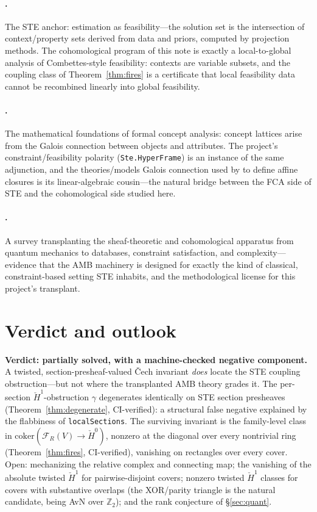 \documentclass[11pt]{article}
\newcommand{\lean}[1]{\texttt{#1}}
\newcommand{\cech}{\v{C}ech}
\newcommand{\Hc}[1]{\check{H}^{#1}}
\newcommand{\FR}{\mathcal{F}_R}
\newcommand{\coker}{\mathrm{coker}}
\newcommand{\Z}{\mathbb{Z}}
\begin{document}
\paragraph{\citet{combettes1993}.}
The STE anchor: estimation as feasibility---the solution set is the
intersection of context/property sets derived from data and priors,
computed by projection methods.  The cohomological program of this
note is exactly a local-to-global analysis of Combettes-style
feasibility: contexts are variable subsets, and the coupling class of
Theorem~\ref{thm:fires} is a certificate that local feasibility data
cannot be recombined linearly into global feasibility.

\paragraph{\citet{ganter1999fca}.}
The mathematical foundations of formal concept analysis: concept
lattices arise from the Galois connection between objects and
attributes.  The project's constraint/feasibility polarity
(\lean{Ste.HyperFrame}) is an instance of the same adjunction, and the
theories/models Galois connection used by
\citet[\S4]{abramsky2015paradox} to define affine closures is its
linear-algebraic cousin---the natural bridge between the FCA side of
STE and the cohomological side studied here.

\paragraph{\citet{abramsky2014contextualsemantics}.}
A survey transplanting the sheaf-theoretic and cohomological apparatus
from quantum mechanics to databases, constraint satisfaction, and
complexity---evidence that the AMB machinery is designed for exactly
the kind of classical, constraint-based setting STE inhabits, and the
methodological license for this project's transplant.

\section{Verdict and outlook}
\label{sec:verdict}

\textbf{Verdict: partially solved, with a machine-checked negative
component.}  A twisted, section-presheaf-valued \cech{} invariant
\emph{does} locate the STE coupling obstruction---but not where the
transplanted AMB theory grades it.  The per-section
$\Hc{1}$-obstruction $\gamma$ degenerates identically on STE section
presheaves (Theorem~\ref{thm:degenerate}, CI-verified): a structural
false negative explained by the flabbiness of \lean{localSections}.
The surviving invariant is the family-level class in
$\coker(\FR(V) \to \Hc{0})$, nonzero at the diagonal over every
nontrivial ring (Theorem~\ref{thm:fires}, CI-verified), vanishing on
rectangles over every cover.  Open: mechanizing the relative complex
and connecting map; the vanishing of the absolute twisted $\Hc{1}$ for
pairwise-disjoint covers; nonzero twisted $\Hc{1}$ classes for covers
with substantive overlaps (the XOR/parity triangle is the natural
candidate, being AvN over $\Z_2$); and the rank conjecture of
\S\ref{sec:quant}.



\end{document}
